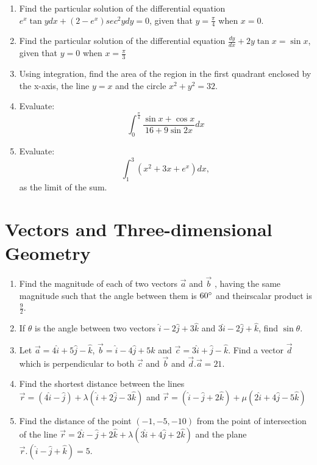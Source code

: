 \documentclass{article}
\providecommand{\brak}[1]{\ensuremath{\left(#1\right)}}
\begin{document}
\begin{enumerate}
\item Find the particular solution of the differential equation $e^{x}\tan y dx+\brak{2-e^{x}}sec^{2}y dy=0$, given that $y=\frac {\pi}{4}$ when $x=0$.
\item Find the particular solution of the differential equation $\frac {dy}{dx} +2y \tan x= \sin x$, given that $y=0$ when $x=\frac{\pi}{3}$
\item Using integration, find the area of the region in the first quadrant 
enclosed by the x-axis, the line $y = x$ and the circle $x^{2}+y^{2} = 32.$
\item Evaluate:
	\[ \int_{0}^{\frac{\pi}{4}}\frac{\sin x + \cos x}{16 + 9 \sin 2x}dx \]
\item Evaluate:
	\[\int_{1}^{3} \brak{x^2 + 3x + e^x}dx, \]  as the limit of the sum.
		\end{enumerate}
\section{Vectors and Three-dimensional Geometry}
\begin{enumerate}
\item Find the magnitude of each of two vectors $\vec{a}$ and $\vec{b}$ , having the same magnitude such that the angle  between them is $60\degree{}$ and theirscalar product is $\frac{9}{2}$.
\item If $\theta$ is the angle between two vectors $\hat{i}-2\hat{j}+3\hat{k}$ and $3\hat{i}-2\hat{j}+\hat{k}$, find $\sin\theta$.
\item Let $\vec{a}=4\hat{i}+5\hat{j}-\hat{k}$, $\vec{b}=\hat{i}-4\hat{j}+5\hat{k}$ and $\vec{c}=3\hat{i}+\hat{j}-\hat{k}$. Find a vector $\vec{d}$ which is perpendicular to both $\vec{c}$ and $\vec{b}$ and $\vec{d}.\vec{a}=21$.
\item Find the shortest distance between the lines \\ $\vec{r} = \brak{4\hat{i}-\hat{j}}+\lambda\brak{\hat{i}+2\hat{j}-3\hat{k}}$ and $\vec{r} = \brak{\hat{i}-\hat{j}+2\hat{k}}+ \mu\brak{2\hat{i}+4\hat{j}-5\hat{k}}$
\item Find the distance of the point \brak{-1,-5,-10} from the point of intersection of the line $\vec{r}=2\hat{i}-\hat{j}+2\hat{k}+\lambda{\brak{3\hat{i}+4\hat{j}+2\hat{k}}}$ and the plane $\vec{r}.\brak{\hat{i}-\hat{j}+\hat{k}}=5.$
\end{enumerate}
\end{document}
